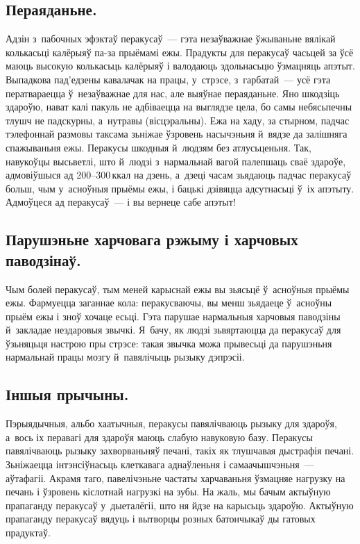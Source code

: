 \subsection{Пераяданьне.}
Адзін з~пабочных эфэктаў перакусаў~--- гэта незаўважнае ўжываньне вялікай колькасьці калёрыяў па-за прыёмамі ежы. Прадукты для перакусаў часьцей за ўсё маюць высокую колькасьць калёрыяў і валодаюць здольнасьцю ўзмацняць апэтыт. Выпадкова пад'едзены кавалачак на працы, у~стрэсе, з~гарбатай~--- усё гэта ператвараецца ў~незаўважнае для нас, але выяўнае пераяданьне. Яно шкодзіць здароўю, нават калі пакуль не адбіваецца на выглядзе цела, бо самы небясьпечны тлушч не падскурны, а~нутравы (вісцэральны). Ежа на хаду, за стырном, падчас тэлефоннай размовы таксама зьніжае ўзровень насычэньня й~вядзе да залішняга спажываньня ежы. Перакусы шкодныя й~людзям без атлусьценьня. Так, навукоўцы высьветлі, што й~людзі з~нармальнай вагой палепшаць сваё здароўе, адмовіўшыся ад 200--300\,ккал на дзень, а~дзеці часам зьядаюць падчас перакусаў больш, чым у~асноўныя прыёмы ежы, і бацькі дзівяцца адсутнасьці ў~іх апэтыту. Адмоўцеся ад перакусаў~--- і вы вернеце сабе апэтыт!

\subsection{Парушэньне харчовага рэжыму і харчовых паводзінаў.}
Чым болей перакусаў, тым меней карыснай ежы вы зьясьцё ў~асноўныя прыёмы ежы. Фармуецца заганнае кола: перакусваючы, вы менш зьядаеце ў~асноўны прыём ежы і зноў хочаце есьці. Гэта парушае нармальныя харчовыя паводзіны й~закладае нездаровыя звычкі. Я~бачу, як людзі зьвяртаюцца да перакусаў для ўзьняцьця настрою пры стрэсе: такая звычка можа прывесьці да парушэньня нармальнай працы мозгу й~павялічыць рызыку дэпрэсіі.


\subsection{Іншыя прычыны.}
Пэрыядычныя, альбо хаатычныя, перакусы павялічваюць рызыку для здароўя, а~вось іх перавагі для здароўя маюць слабую навуковую базу. Перакусы павялічваюць рызыку захворваньняў печані, такіх як тлушчавая дыстрафія печані. Зьніжаецца інтэнсіўнасьць клеткавага аднаўленьня і самаачышчэньня~--- аўтафагіі. Акрамя таго, павелічэньне частаты харчаваньня ўзмацняе нагрузку на печань і ўзровень кіслотнай нагрузкі на зубы. На жаль, мы бачым актыўную прапаганду перакусаў у~дыеталёгіі, што ня йдзе на карысьць здароўю. Актыўную прапаганду перакусаў вядуць і вытворцы розных батончыкаў ды гатовых прадуктаў.

